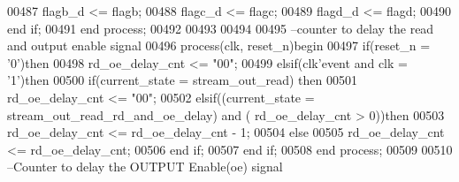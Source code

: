 \begin{DoxyCode}
00487         flagb\_d <= flagb;
00488         flagc\_d <= flagc;
00489         flagd\_d <= flagd;
00490     \textcolor{keywordflow}{end} \textcolor{keywordflow}{if}; 
00491 \textcolor{keywordflow}{end} \textcolor{keywordflow}{process};
00492 
00493 
00494 
00495 \textcolor{keyword}{--counter to delay the read and output enable signal}
00496 \textcolor{keywordflow}{process}(clk, reset_n)\textcolor{keywordflow}{begin}
00497     \textcolor{keywordflow}{if}\textcolor{vhdlchar}{(}\textcolor{vhdlchar}{reset_n} \textcolor{vhdlchar}{=} \textcolor{vhdlchar}{'}\textcolor{vhdllogic}{}\textcolor{vhdllogic}{0}\textcolor{vhdlchar}{'}\textcolor{vhdlchar}{)}\textcolor{keywordflow}{then} 
00498         \textcolor{vhdlchar}{rd_oe_delay_cnt} \textcolor{vhdlchar}{<=} \textcolor{vhdllogic}{"00"};
00499     \textcolor{keywordflow}{elsif}\textcolor{vhdlchar}{(}\textcolor{vhdlchar}{clk}\textcolor{vhdlchar}{'}\textcolor{vhdlkeyword}{event} \textcolor{keywordflow}{and} \textcolor{vhdlchar}{clk} \textcolor{vhdlchar}{=} \textcolor{vhdlchar}{'}\textcolor{vhdllogic}{}\textcolor{vhdllogic}{1}\textcolor{vhdlchar}{'}\textcolor{vhdlchar}{)}\textcolor{keywordflow}{then}  
00500         \textcolor{keywordflow}{if}\textcolor{vhdlchar}{(}\textcolor{vhdlchar}{current_state} \textcolor{vhdlchar}{=} \textcolor{vhdlchar}{stream\_out\_read}\textcolor{vhdlchar}{)} \textcolor{keywordflow}{then}
00501             \textcolor{vhdlchar}{rd_oe_delay_cnt} \textcolor{vhdlchar}{<=} \textcolor{vhdllogic}{"00"};
00502       \textcolor{keywordflow}{elsif}\textcolor{vhdlchar}{(}\textcolor{vhdlchar}{(}\textcolor{vhdlchar}{current_state} \textcolor{vhdlchar}{=} \textcolor{vhdlchar}{stream\_out\_read\_rd\_and\_oe\_delay}\textcolor{vhdlchar}{)} \textcolor{keywordflow}{and} \textcolor{vhdlchar}{(}\textcolor{vhdlchar}{
      rd_oe_delay_cnt} \textcolor{vhdlchar}{>} \textcolor{vhdllogic}{}\textcolor{vhdllogic}{0}\textcolor{vhdlchar}{)}\textcolor{vhdlchar}{)}\textcolor{keywordflow}{then}
00503             \textcolor{vhdlchar}{rd_oe_delay_cnt} \textcolor{vhdlchar}{<=} \textcolor{vhdlchar}{rd_oe_delay_cnt} \textcolor{vhdlchar}{-} \textcolor{vhdllogic}{}\textcolor{vhdllogic}{1};
00504         \textcolor{keywordflow}{else}
00505             \textcolor{vhdlchar}{rd_oe_delay_cnt} \textcolor{vhdlchar}{<=} \textcolor{vhdlchar}{rd_oe_delay_cnt};
00506         \textcolor{keywordflow}{end} \textcolor{keywordflow}{if};
00507     \textcolor{keywordflow}{end} \textcolor{keywordflow}{if};
00508 \textcolor{keywordflow}{end} \textcolor{keywordflow}{process};
00509 
00510 \textcolor{keyword}{--Counter to delay the OUTPUT Enable(oe) signal}

\end{DoxyCode}
